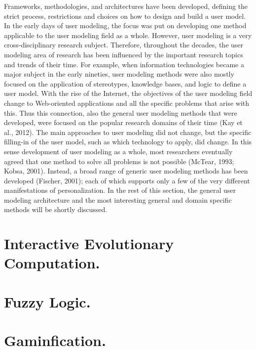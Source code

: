 Frameworks,  methodologies, and architectures have been developed, defining the
strict process, restrictions and choices on how to design and build a user
model.  In the early days of user modeling, the focus was put on developing one
method applicable to the user modeling field as a whole. However, user modeling
is a very cross‐disciplinary research subject. Therefore, throughout the
decades, the user modeling area of research has been influenced by the important
research topics and trends of their time. For example, when information
technologies became a major subject in the early nineties, user modeling methods
were also mostly focused on the application of stereotypes, knowledge bases, and
logic to define a user model. With the rise of the Internet, the objectives of
the user modeling field change to Web-oriented applications and all the specific
problems that arise with this. Thus this connection,  also the general user
modeling methods that were developed, were focused on the popular research
domains of their time (Kay et al., 2012). The main approaches to user modeling
did not change, but the specific filling‐in of the user model, such as which
technology to apply, did change. In this sense development of user modeling as a
whole, most researchers eventually agreed that one method to solve all problems
is not possible (McTear, 1993; Kobsa, 2001). Instead, a broad range of  generic
user modeling methods has been developed (Fischer, 2001); each of which supports
only a few of the very different manifestations of personalization. In the rest
of this section, the general user modeling architecture and the most interesting
general and domain specific methods will be shortly discussed.




\section{Interactive Evolutionary Computation.}

\section{Fuzzy Logic.}

\section{Gaminfication.}


















